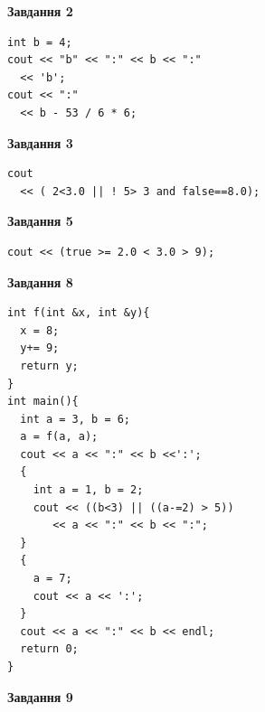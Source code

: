 \documentclass[12pt, ukrainian]{article}
\begin{document}
{\begin {large}
\begin{minipage}[t]{7.0cm}
\end{minipage}
\vline \hspace{1mm}
\begin{minipage}[t]{11.0cm}

\begin{center}
\textbf{Завдання 2}
\end{center}
\vspace{-8mm}

\begin{verbatim}
int b = 4;
cout << "b" << ":" << b << ":" 
  << 'b';
cout << ":" 
  << b - 53 / 6 * 6;
\end{verbatim}



\begin{center}
\textbf{Завдання 3}
\end{center}
\vspace{-8mm}

\begin{verbatim}
cout 
  << ( 2<3.0 || ! 5> 3 and false==8.0);
\end{verbatim}



\begin{center}
\textbf{Завдання 5}
\end{center}
\vspace{-8mm}

\begin{verbatim}
cout << (true >= 2.0 < 3.0 > 9);
\end{verbatim}



\begin{center}
\textbf{Завдання 8}
\end{center}
\vspace{-8mm}

\begin{verbatim}
int f(int &x, int &y){
  x = 8;
  y+= 9;
  return y;
}
int main(){
  int a = 3, b = 6;
  a = f(a, a);
  cout << a << ":" << b <<':';
  {
    int a = 1, b = 2;
    cout << ((b<3) || ((a-=2) > 5))
       << a << ":" << b << ":";
  }
  {
    a = 7;
    cout << a << ':';
  }
  cout << a << ":" << b << endl;
  return 0;
}
\end{verbatim}

\end{minipage}


\begin{minipage}[t]{7.0cm}

\begin{center}
\textbf{Завдання 9}
\end{center}
\vspace{-8mm}


\end{minipage}
\end{large}}
\end{document}
